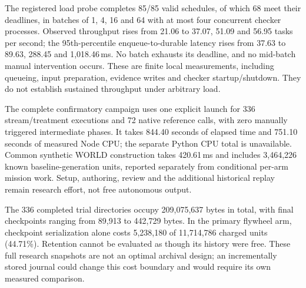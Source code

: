 The registered load probe completes 85/85 valid schedules, of which 68 meet their deadlines, in batches of 1, 4, 16 and 64 with at most four concurrent checker processes. Observed throughput rises from 21.06 to 37.07, 51.09 and 56.95 tasks per second; the 95th-percentile enqueue-to-durable latency rises from 37.63 to 89.63, 288.45 and 1,018.46\,ms. No batch exhausts its deadline, and no mid-batch manual intervention occurs. These are finite local measurements, including queueing, input preparation, evidence writes and checker startup/shutdown. They do not establish sustained throughput under arbitrary load.

The complete confirmatory campaign uses one explicit launch for 336 stream/treatment executions and 72 native reference calls, with zero manually triggered intermediate phases. It takes 844.40 seconds of elapsed time and 751.10 seconds of measured Node CPU; the separate Python CPU total is unavailable. Common synthetic WORLD construction takes 420.61\,ms and includes 3,464,226 known baseline-generation units, reported separately from conditional per-arm mission work. Setup, authoring, review and the additional historical replay remain research effort, not free autonomous output.

The 336 completed trial directories occupy 209,075,637 bytes in total, with final checkpoints ranging from 89,913 to 442,729 bytes. In the primary flywheel arm, checkpoint serialization alone costs 5,238,180 of 11,714,786 charged units (44.71\%). Retention cannot be evaluated as though its history were free. These full research snapshots are not an optimal archival design; an incrementally stored journal could change this cost boundary and would require its own measured comparison.

